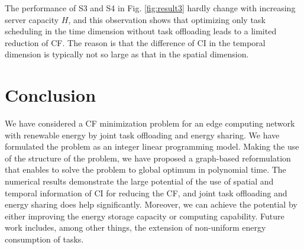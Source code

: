 \documentclass[conference, 10pt, ﬁnal, letterpaper, twocolumn]{IEEEtran}
\begin{document}
The performance of S3 and S4 in Fig. \ref{fig:result3} hardly change with increasing server capacity $H$, and this observation shows that optimizing only task scheduling in the time dimension without task offloading leads to a limited reduction of CF. The reason is that the difference of CI in the temporal dimension is typically not so large as that in the spatial dimension.

\section{Conclusion} \label{Sec:conclusion}
We have considered a CF minimization problem for an edge computing network with renewable energy by joint task offloading and energy sharing. We have formulated the problem as an integer linear programming model. Making the use of the structure of the problem, we have proposed a graph-based reformulation that enables to solve the problem to global optimum in polynomial time. The numerical results demonstrate the large potential of the use of spatial and temporal information of CI for reducing the CF, and joint task offloading and energy sharing does help significantly. Moreover, we can achieve the potential by either improving the energy storage capacity or computing capability. Future work includes, among other things, the extension of non-uniform energy consumption of tasks.



\end{document}
